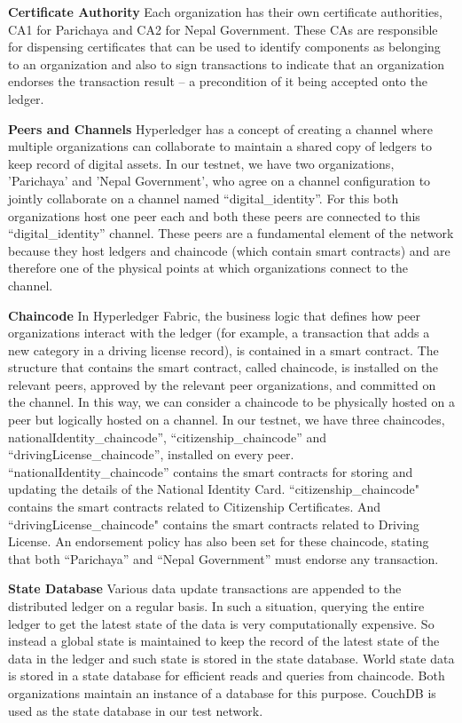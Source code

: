 \textbf{Certificate Authority} \newline
Each organization has their own certificate authorities, CA1 for Parichaya and CA2 for Nepal Government. These CAs are responsible for dispensing certificates that can be used to identify components as belonging to an organization and also to sign transactions to indicate that an organization endorses the transaction result – a precondition of it being accepted onto the ledger. 

\textbf{Peers and Channels} \newline
Hyperledger has a concept of creating a channel where multiple organizations can collaborate to maintain a shared copy of ledgers to keep record of digital assets. In our testnet, we have two organizations, ’Parichaya’ and ’Nepal Government’, who agree on a channel configuration to jointly collaborate on a channel named “digital\_identity”.
For this both organizations host one peer each and both these peers are connected to this “digital\_identity” channel. These peers are a fundamental element of the network because they host ledgers and chaincode (which contain smart contracts) and are therefore one of the physical points at which organizations connect to the channel. 

\textbf{Chaincode} \newline
In Hyperledger Fabric, the business logic that defines how peer organizations interact with the ledger (for example, a transaction that adds a new category in a driving license record), is contained in a smart contract. The structure that contains the smart contract, called chaincode, is installed on the relevant peers, approved by the relevant peer organizations, and committed on the channel. In this way, we can consider a chaincode to be physically hosted on a peer but logically hosted on a channel. In our testnet, we have three chaincodes, nationalIdentity\_chaincode'', “citizenship\_chaincode” and “drivingLicense\_chaincode”, installed on every peer. “nationalIdentity\_chaincode'' contains the smart contracts for storing and updating the details of the National Identity Card. “citizenship\_chaincode" contains the smart contracts related to Citizenship Certificates. And “drivingLicense\_chaincode" contains the smart contracts related to Driving License. An endorsement policy has also been set for these chaincode, stating that both “Parichaya” and “Nepal Government” must endorse any transaction.

\textbf{State Database} \newline
Various data update transactions are appended to the distributed ledger on a regular basis. In such a situation, querying the entire ledger to get the latest state of the data is very computationally expensive. So instead a global state is maintained to keep the record of the latest state of the data in the ledger and such state is stored in the state database.\newline
World state data is stored in a state database for efficient reads and queries from chaincode. Both organizations maintain an instance of a database for this purpose.
CouchDB is used as the state database in our test network.

